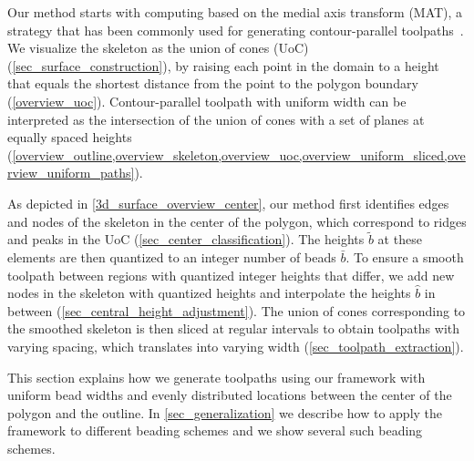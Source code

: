 Our method starts with computing  based on the medial axis transform (MAT), a strategy that has been commonly used for generating contour-parallel toolpaths~\cite{eiamsa2003toward}.
We visualize the skeleton as the union of cones (UoC) (\cref{sec_surface_construction}), by raising each point in the domain to a height that equals the shortest distance from the point to the polygon boundary (\cref{overview_uoc}).
Contour-parallel toolpath with uniform width can be interpreted as the intersection of the union of cones with a set of  planes at equally spaced heights (\cref{overview_outline,overview_skeleton,overview_uoc,overview_uniform_sliced,overview_uniform_paths}).

As depicted in \cref{3d_surface_overview_center}, our method first identifies edges and nodes of the skeleton in the center of the polygon, which correspond to ridges and peaks in the UoC  (\cref{sec_center_classification}).
The heights $\tilde{b}$ at these elements are then quantized to an integer number of beads $\bar{b}$.
To ensure a smooth toolpath between regions with quantized integer heights that differ, we add new nodes in the skeleton with quantized heights and interpolate the heights $\hat{b}$ in between (\cref{sec_central_height_adjustment}).
The union of cones corresponding to the smoothed skeleton is then sliced at regular intervals to obtain toolpaths with varying spacing, which translates into varying width (\cref{sec_toolpath_extraction}).



This section explains how we generate toolpaths using our framework with uniform bead widths and evenly distributed locations between the center of the polygon and the outline.
In \cref{sec_generalization} we describe how to apply the framework to different beading schemes and we show several such beading schemes.




